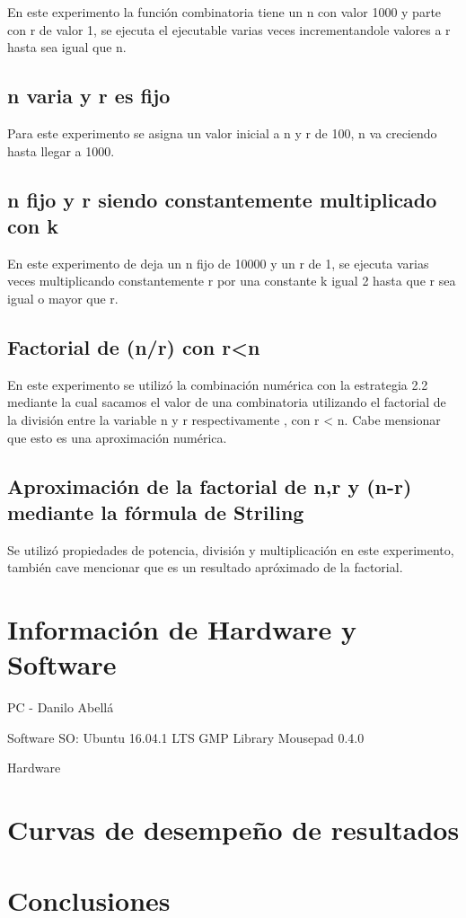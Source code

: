 \documentclass[12pt,letterpaper]{scrartcl}
\begin{document}
En este experimento la función combinatoria tiene un n con valor 1000 y parte con r de valor 1, se ejecuta el ejecutable varias veces incrementandole valores a r hasta sea igual que n.

\subsection{n varia y r es fijo}

Para este experimento se asigna un valor inicial a n y r de 100, n  va creciendo hasta llegar a 1000.

\subsection{n fijo y r siendo constantemente multiplicado con k}


En este experimento de deja un n fijo de 10000 y un r de 1, se ejecuta varias veces multiplicando constantemente r por una constante k igual 2 hasta que r sea igual o mayor que r.

\subsection{Factorial de (n/r) con r<n}

En este experimento se utilizó la combinación numérica con la estrategia 2.2 mediante la cual sacamos el valor de una combinatoria utilizando el factorial de la división entre la variable n y r respectivamente , con r < n.
Cabe mensionar que esto es una aproximación numérica.


\subsection{Aproximación de la factorial de n,r y (n-r) mediante la fórmula de Striling}

Se utilizó propiedades de potencia, división y multiplicación en este experimento, también cave mencionar que es un resultado apróximado de la factorial.

\section{Información de Hardware y Software}

PC - Danilo Abellá

Software
SO: Ubuntu 16.04.1 LTS
GMP Library
Mousepad 0.4.0

Hardware



\section{Curvas de desempeño de resultados}

\section{Conclusiones}
\end{document}
